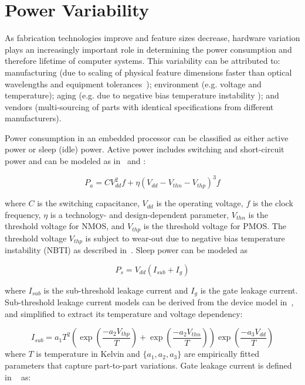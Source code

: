 \section{Power Variability}
\label{sec:variability}

As fabrication technologies improve and feature sizes decrease, hardware variation plays an increasingly important role in determining the power consumption and therefore lifetime of computer systems. This variability can be attributed to: manufacturing (due to scaling of physical feature dimensions faster than optical wavelengths and equipment tolerances~\cite{Bernstein:2006,Cao:2002}); environment (e.g. voltage and temperature); aging (e.g. due to negative bias temperature instability \cite{Zheng:2009}); and vendors (multi-sourcing of parts with identical specifications from different manufacturers). 


Power consumption in an embedded processor can be classified as either active power or sleep (idle) power. Active power includes switching and short-circuit power and can be modeled as in~\cite{RabaeyCN96} and \cite{Veendrick84}:


\begin{equation}
P_{a} ={C} V_{dd}^2f + {\eta(V_{dd}-V_{thn}-V_{thp})^3f}
\label{equ:switching_power}
\end{equation}



\noindent where $C$ is the switching capacitance, $V_{dd}$ is the operating voltage, $f$ is the clock frequency, $\eta$ is a technology- and design-dependent parameter, $V_{thn}$ is the threshold voltage for NMOS,
and $V_{thp}$ is the threshold voltage for PMOS.
The threshold voltage $V_{thp}$ is subject to wear-out due to negative bias temperature instability (NBTI) as described in~\cite{ChenWC12,BhardwajWV06,WangYB07}.
%
Sleep power can be modeled as 

\begin{equation}
P_{s} = V_{dd} (I_{sub}+I_{g})
\end{equation}

where $I_{sub}$ is the sub-threshold leakage current and $I_{g}$ is the gate leakage current. Sub-threshold leakage current models can be derived from the device model in~\cite{BSIM}, and simplified to extract its temperature and voltage dependency:

\begin{equation}
I_{sub} = a_{1} T^2 \left(\exp\left(\frac{-a_{2}V_{thp}}{T}\right)+\exp\left(\frac{-a_{2}V_{thn}}{T}\right)\right)\exp\left(\frac{-a_{3}V_{dd}}{T}\right)
\end{equation}
where $T$ is temperature in Kelvin and $\{a_{1}, a_2, a_3\}$ are empirically fitted parameters that capture part-to-part variations. Gate leakage current is defined in ~\cite{KimAB03} as:

